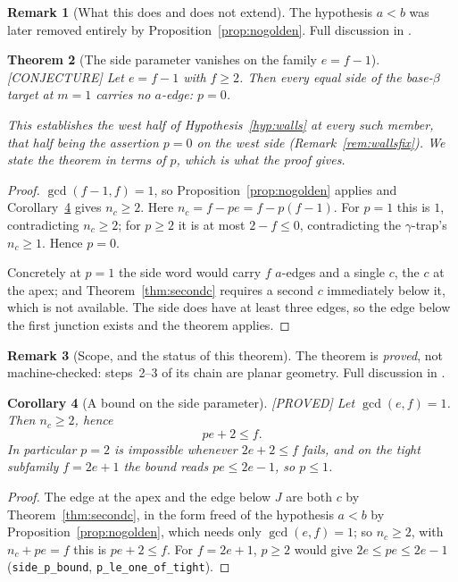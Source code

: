 \documentclass[11pt,reqno]{amsart}
\theoremstyle{plain}
\newtheorem{theorem}{Theorem}
\newtheorem{corollary}[theorem]{Corollary}
\theoremstyle{definition}
\newtheorem{remark}[theorem]{Remark}
\newcommand{\lab}[1]{\hfill\textnormal{\footnotesize\textsc{[#1]}}}
\begin{document}
\begin{remark}[What this does and does not extend]\label{rem:abnecessary}
The hypothesis $a<b$ was later removed entirely by Proposition~\ref{prop:nogolden}. Full discussion in \cite{Obstructions}.
\end{remark}

\begin{theorem}[The side parameter vanishes on the family $e=f-1$]\label{thm:efminus1}\lab{CONJECTURE}
Let $e=f-1$ with $f\ge2$. Then every equal side of the base-$\beta$ target at $m=1$ carries no
$a$-edge: $p=0$.

This establishes the \emph{west} half of Hypothesis~\ref{hyp:walls} at every such member, that half
being the assertion $p=0$ on the west side (Remark~\ref{rem:wallsfix}). We state the theorem in terms
of $p$, which is what the proof gives.
\end{theorem}

\begin{proof}
$\gcd(f-1,f)=1$, so Proposition~\ref{prop:nogolden} applies and Corollary~\ref{cor:pbound} gives
$n_c\ge2$. Here $n_c=f-pe=f-p(f-1)$. For $p=1$ this is $1$, contradicting $n_c\ge2$; for $p\ge2$ it is
at most $2-f\le0$, contradicting the $\gamma$-trap's $n_c\ge1$. Hence $p=0$.

Concretely at $p=1$ the side word would carry $f$ $a$-edges and a single $c$, the $c$ at the apex; and
Theorem~\ref{thm:secondc} requires a second $c$ immediately below it, which is not available. The side
does have at least three edges, so the edge below the first junction exists and the theorem applies.
\end{proof}

\begin{remark}[Scope, and the status of this theorem]\label{rem:efminus1}
The theorem is \emph{proved}, not machine-checked: steps~2--3 of its chain are planar geometry. Full discussion in \cite{Obstructions}.
\end{remark}


\begin{corollary}[A bound on the side parameter]\label{cor:pbound}\lab{PROVED}
Let $\gcd(e,f)=1$. Then $n_c\ge2$, hence
\[
pe+2\le f .
\]
In particular $p=2$ is impossible whenever $2e+2\le f$ fails, and on the tight subfamily $f=2e+1$ the
bound reads $pe\le 2e-1$, so $p\le1$.
\end{corollary}

\begin{proof}
The edge at the apex and the edge below $J$ are both $c$ by Theorem~\ref{thm:secondc}, in the form
freed of the hypothesis $a<b$ by Proposition~\ref{prop:nogolden}, which needs only $\gcd(e,f)=1$; so
$n_c\ge2$,
with $n_c+pe=f$ this is $pe+2\le f$. For $f=2e+1$, $p\ge2$ would give $2e\le pe\le2e-1$
(\texttt{side\_p\_bound}, \texttt{p\_le\_one\_of\_tight}).
\end{proof}
\end{document}
